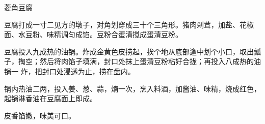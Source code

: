 %
%
%
%
%
%
%
\begin{recipe}{菱角豆腐}

\ingredients


\preparation

\step 豆腐打成一寸二见方的墩子，对角划穿成三十个三角形。猪肉剁茸，加盐、花椒
面、水豆粉、味精调匀成馅。豆粉合蛋清搅成蛋清豆粉。

\step 豆腐投入九成热的油锅。炸成金黄色皮捞起，挨个地从底部逢中划个小口，取出瓤
子，掏空；然后将肉馅子填满，封口处抹上蛋清豆粉粘好合拢；再投入八成热的油锅一
炸，把封口处浸透为止，捞在盘内。

\step 锅内热油二两，投入姜、葱、蒜，煵一次，烹入料酒，加酱油、味精，烧成红色，
起锅淋香油在豆腐面上即成。

\features

皮香馅嫩，味美可口。

\end{recipe}

